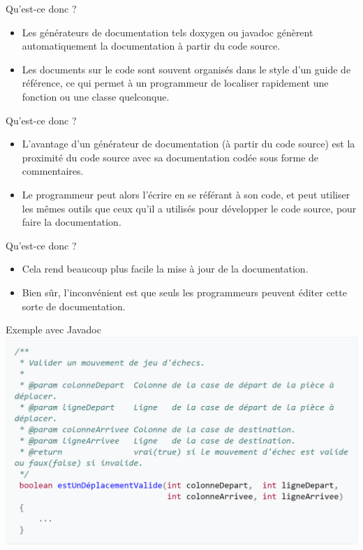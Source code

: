 \documentclass{beamer}
\begin{document}
\begin{frame}{Qu'est-ce donc ?}
  \begin{itemize}
  \item {
   Les générateurs de documentation tels doxygen ou javadoc génèrent automatiquement la documentation à partir du code source. 
  }
  \item {
    Les documents sur le code sont souvent organisés dans le style d'un guide de référence, ce qui permet à un programmeur de localiser rapidement une fonction ou une classe quelconque.
  }
  \end{itemize}
\end{frame}

\begin{frame}{Qu'est-ce donc ?}
\begin{itemize}
    \item {
    L'avantage d'un générateur de documentation (à partir du code source) est la proximité du code source avec sa documentation codée sous forme de commentaires. 
    }
    \item {
    Le programmeur peut alors l'écrire en se référant à son code, et peut utiliser les mêmes outils que ceux qu'il a utilisés pour développer le code source, pour faire la documentation. 
    }
    \end{itemize}
\end{frame}

\begin{frame}{Qu'est-ce donc ?}
\begin{itemize}
    \item {
    Cela rend beaucoup plus facile la mise à jour de la documentation. 
    }
    \item {
   Bien sûr, l'inconvénient est que seuls les programmeurs peuvent éditer cette sorte de documentation.
    }
    \end{itemize}
\end{frame}
\begin{frame}{Exemple avec Javadoc}
\includegraphics[scale=0.28]{Images/lol.png}
\end{frame}
\end{document}
